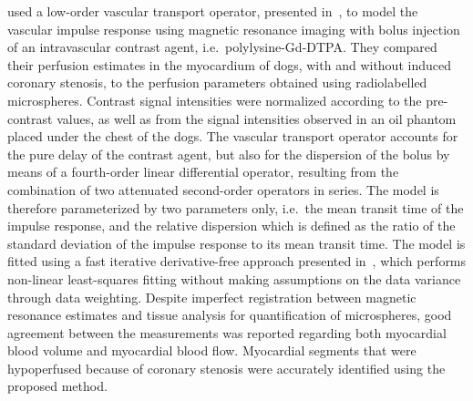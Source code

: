 \citet{Wilke:1995dt} used a low-order vascular transport operator, presented in~\cite{King:1993uj}, to model the vascular impulse response using magnetic resonance imaging with bolus injection of an intravascular contrast agent, i.e.~polylysine-Gd-DTPA. 
They compared their perfusion estimates in the myocardium of dogs, with and without induced coronary stenosis, to the perfusion parameters obtained using radiolabelled microspheres.
Contrast signal intensities were normalized according to the pre-contrast values, as well as from the signal intensities observed in an oil phantom placed under the chest of the dogs.
The vascular transport operator accounts for the pure delay of the contrast agent, but also for the dispersion of the bolus by means of a fourth-order linear differential operator, resulting from the combination of two attenuated second-order operators in series.
The model is therefore parameterized by two parameters only, i.e.~the mean transit time of the impulse response, and the relative dispersion which is defined as the ratio of the standard deviation of the impulse response to its mean transit time.
The model is fitted using a fast iterative derivative-free approach presented in~\cite{Chan:1993ve}, which performs non-linear least-squares fitting without making assumptions on the data variance through data weighting.
Despite imperfect registration between magnetic resonance estimates and tissue analysis for quantification of microspheres, good agreement between the measurements was reported regarding both myocardial blood volume and myocardial blood flow.
Myocardial segments that were hypoperfused because of coronary stenosis were accurately identified using the proposed method.

